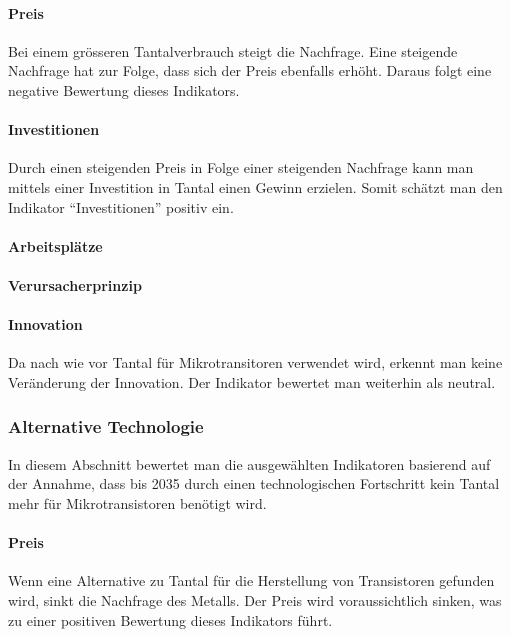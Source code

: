 \paragraph{Preis}
Bei einem grösseren Tantalverbrauch steigt die Nachfrage. Eine steigende
Nachfrage hat zur Folge, dass sich der Preis ebenfalls erhöht. Daraus folgt eine
negative Bewertung dieses Indikators.

\paragraph{Investitionen}
Durch einen steigenden Preis in Folge einer steigenden Nachfrage kann man
mittels einer Investition in Tantal einen Gewinn erzielen. Somit schätzt man den
Indikator ``Investitionen'' positiv ein.

\paragraph{Arbeitsplätze}

\paragraph{Verursacherprinzip}

\paragraph{Innovation}
Da nach wie vor Tantal für Mikrotransitoren verwendet wird, erkennt man keine
Veränderung der Innovation. Der Indikator bewertet man weiterhin als neutral.

\subsubsection{Alternative Technologie}
In diesem Abschnitt bewertet man die ausgewählten Indikatoren basierend auf der
Annahme, dass bis 2035 durch einen technologischen Fortschritt kein Tantal mehr
für Mikrotransistoren benötigt wird.

\paragraph{Preis}
Wenn eine Alternative zu Tantal für die Herstellung von Transistoren gefunden
wird, sinkt die Nachfrage des Metalls. Der Preis wird voraussichtlich sinken,
was zu einer positiven Bewertung dieses Indikators führt.

